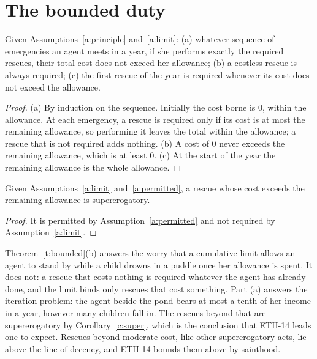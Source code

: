 \documentclass{situationist-preprint}
\begin{document}
\section{The bounded duty}

\begin{theorem}\label{t:bounded}
Given Assumptions~\ref{a:principle} and~\ref{a:limit}: (a) whatever sequence of emergencies an agent meets in a year, if she performs exactly the required rescues, their total cost does not exceed her allowance; (b) a costless rescue is always required; (c) the first rescue of the year is required whenever its cost does not exceed the allowance.
\end{theorem}

\begin{proof}
(a) By induction on the sequence. Initially the cost borne is $0$, within the allowance. At each emergency, a rescue is required only if its cost is at most the remaining allowance, so performing it leaves the total within the allowance; a rescue that is not required adds nothing. (b) A cost of $0$ never exceeds the remaining allowance, which is at least $0$. (c) At the start of the year the remaining allowance is the whole allowance.
\end{proof}

\begin{corollary}\label{c:super}
Given Assumptions~\ref{a:limit} and~\ref{a:permitted}, a rescue whose cost exceeds the remaining allowance is supererogatory.
\end{corollary}

\begin{proof}
It is permitted by Assumption~\ref{a:permitted} and not required by Assumption~\ref{a:limit}.
\end{proof}

Theorem~\ref{t:bounded}(b) answers the worry that a cumulative limit allows an agent to stand by while a child drowns in a puddle once her allowance is spent. It does not: a rescue that costs nothing is required whatever the agent has already done, and the limit binds only rescues that cost something. Part (a) answers the iteration problem: the agent beside the pond bears at most a tenth of her income in a year, however many children fall in. The rescues beyond that are supererogatory by Corollary~\ref{c:super}, which is the conclusion that ETH-14 leads one to expect. Rescues beyond moderate cost, like other supererogatory acts, lie above the line of decency, and ETH-14 bounds them above by sainthood.
\end{document}
